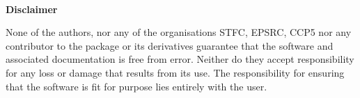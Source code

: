 
~

\vspace{1.5 in} \centerline{{\bf Disclaimer}} \vspace{1 in} None of the
authors, nor any of the organisations STFC, EPSRC, CCP5 nor any contributor to
the \D{} package or its derivatives guarantee that the software and associated
documentation is free from error.  Neither do they accept responsibility for
any loss or damage that results from its use. The responsibility for ensuring
that the software is fit for purpose lies entirely with the user.  \clearpage
